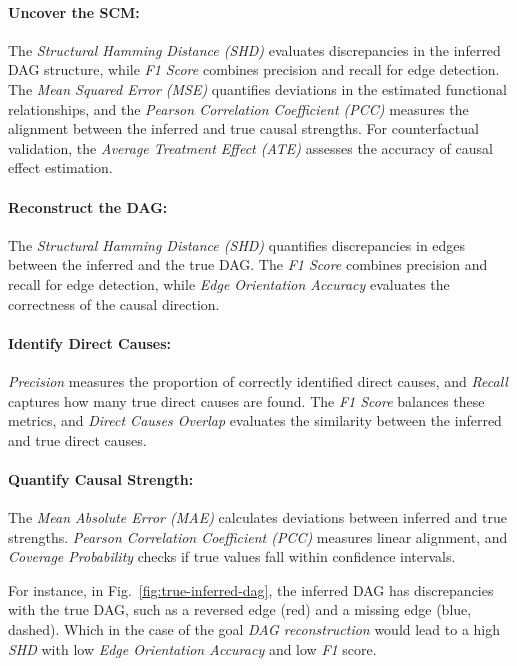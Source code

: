 \documentclass{uai2024} %
\begin{document}
            \paragraph{Uncover the SCM:}
                The \emph{Structural Hamming Distance (SHD)} evaluates discrepancies in the inferred DAG structure, while \emph{F1 Score} combines precision and recall for edge detection. 
                The \emph{Mean Squared Error (MSE)} quantifies deviations in the estimated functional relationships, and the \emph{Pearson Correlation Coefficient (PCC)} measures the alignment between the inferred and true causal strengths. 
                For counterfactual validation, the \emph{Average Treatment Effect (ATE)} assesses the accuracy of causal effect estimation.

            \paragraph{Reconstruct the DAG:}
                The \emph{Structural Hamming Distance (SHD)} quantifies discrepancies in edges between the inferred and the true DAG.
                The \emph{F1 Score} combines precision and recall for edge detection, while \emph{Edge Orientation Accuracy} evaluates the correctness of the causal direction.
            
            \paragraph{Identify Direct Causes:}
                \emph{Precision} measures the proportion of correctly identified direct causes, and \emph{Recall} captures how many true direct causes are found. 
                The \emph{F1 Score} balances these metrics, and \emph{Direct Causes Overlap} evaluates the similarity between the inferred and true direct causes.
            
            \paragraph{Quantify Causal Strength:}
                The \emph{Mean Absolute Error (MAE)} calculates deviations between inferred and true strengths. 
                \emph{Pearson Correlation Coefficient (PCC)} measures linear alignment, and \emph{Coverage Probability} checks if true values fall within confidence intervals.

            For instance, in Fig.~\ref{fig:true-inferred-dag}, the inferred DAG has discrepancies with the true DAG, such as a reversed edge (red) and a missing edge (blue, dashed).
            Which in the case of the goal \emph{DAG reconstruction} would lead to a high \emph{SHD} with low \emph{Edge Orientation Accuracy} and low \emph{F1} score.
\end{document}

